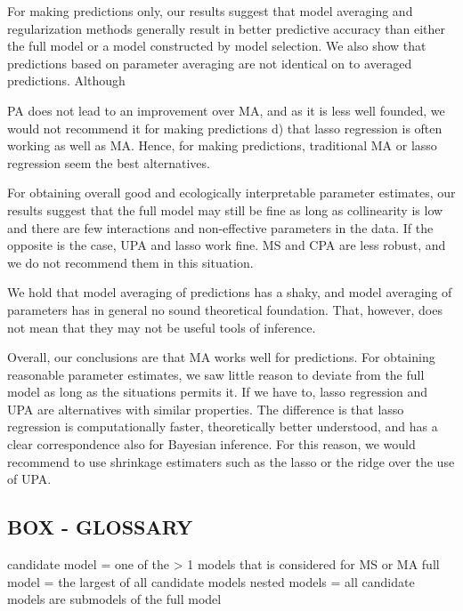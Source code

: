 \documentclass[5p]{elsarticle}
\begin{document}
For making predictions only, our results suggest that model averaging and regularization methods generally result in better predictive accuracy than either the full model or a model constructed by model selection. We also show that predictions based on parameter averaging are not identical on to averaged predictions. Although 


PA does not lead to an improvement over MA, and as it is less well founded, we would not recommend it for making predictions d) that lasso regression is often working as well as MA. Hence, for making predictions, traditional MA or lasso regression seem the best alternatives.

For obtaining overall good and ecologically interpretable parameter estimates, our results suggest that the full model may still be fine as long as collinearity is low and there are few interactions and non-effective parameters in the data. If the opposite is the case, UPA and lasso work fine. MS and CPA are less robust, and we do not recommend them in this situation.

We hold that model averaging of predictions has a shaky, and model averaging of parameters has in general no sound theoretical foundation. That, however, does not mean that they may not be useful tools of inference. 


Overall, our conclusions are that MA works well for predictions. For obtaining reasonable parameter estimates, we saw little reason to deviate from the full model as long as the situations permits it. If we have to, lasso regression and UPA are alternatives with similar properties. The difference is that lasso regression is computationally faster, theoretically better understood, and has a clear correspondence also for Bayesian inference. For this reason, we would recommend to use shrinkage estimaters such as the lasso or the ridge over the use of UPA. 



%



\subsection{BOX - GLOSSARY}

candidate model = one of the > 1 models that is considered for MS or MA
full model = the largest of all candidate models
nested models = all candidate models are submodels of the full model
\end{document}

